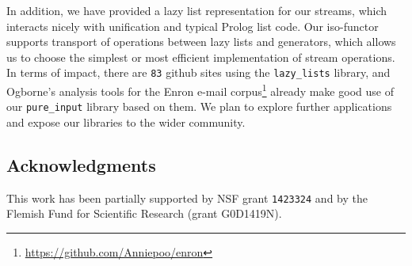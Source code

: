 \documentclass[submission,copyright,creativecommons]{eptcs}
\begin{document}
In addition, we have provided a lazy list representation for our streams, which
interacts nicely with unification and typical Prolog list code. Our iso-functor
supports  transport of operations between lazy lists and generators, which
allows us to choose the simplest or most efficient implementation of stream
operations. In terms of impact, there are {\tt 83} github sites using the {\tt lazy\_lists} library, and
 Ogborne's analysis tools for the Enron e-mail
corpus\footnote{\url{https://github.com/Anniepoo/enron}} already make good use
of our {\tt pure\_input} library based on them. We plan to explore further applications and
expose our libraries to the wider community.


\subsection*{Acknowledgments}
This work has been partially supported by NSF grant \verb~1423324~
and by the Flemish Fund for Scientific Research (grant G0D1419N).



\end{document}
